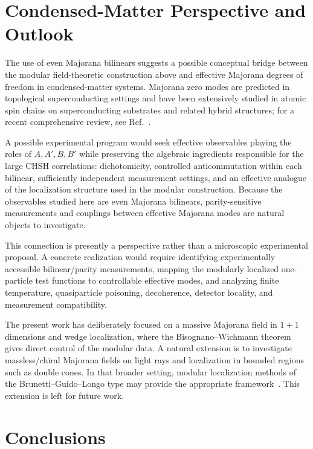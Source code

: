 \documentclass[11pt]{article}
\begin{document}
\section{Condensed-Matter Perspective and Outlook}
\label{sec:perspective}

The use of even Majorana bilinears suggests a possible conceptual bridge between the modular field-theoretic construction above and effective Majorana degrees of freedom in condensed-matter systems. Majorana zero modes are predicted in topological superconducting settings and have been extensively studied in atomic spin chains on superconducting substrates and related hybrid structures; for a recent comprehensive review, see Ref.~\cite{RachelWiesendanger2025}.

A possible experimental program would seek effective observables playing the roles of $A,A',B,B'$ while preserving the algebraic ingredients responsible for the large CHSH correlations: dichotomicity, controlled anticommutation within each bilinear, sufficiently independent measurement settings, and an effective analogue of the localization structure used in the modular construction. Because the observables studied here are even Majorana bilinears, parity-sensitive measurements and couplings between effective Majorana modes are natural objects to investigate.

This connection is presently a perspective rather than a microscopic experimental proposal. A concrete realization would require identifying experimentally accessible bilinear/parity measurements, mapping the modularly localized one-particle test functions to controllable effective modes, and analyzing finite temperature, quasiparticle poisoning, decoherence, detector locality, and measurement compatibility.

The present work has deliberately focused on a massive Majorana field in $1+1$ dimensions and wedge localization, where the Bisognano--Wichmann theorem gives direct control of the modular data. A natural extension is to investigate massless/chiral Majorana fields on light rays and localization in bounded regions such as double cones. In that broader setting, modular localization methods of the Brunetti--Guido--Longo type may provide the appropriate framework~\cite{BrunettiGuidoLongo1993}. This extension is left for future work.

\section{Conclusions}
\end{document}
